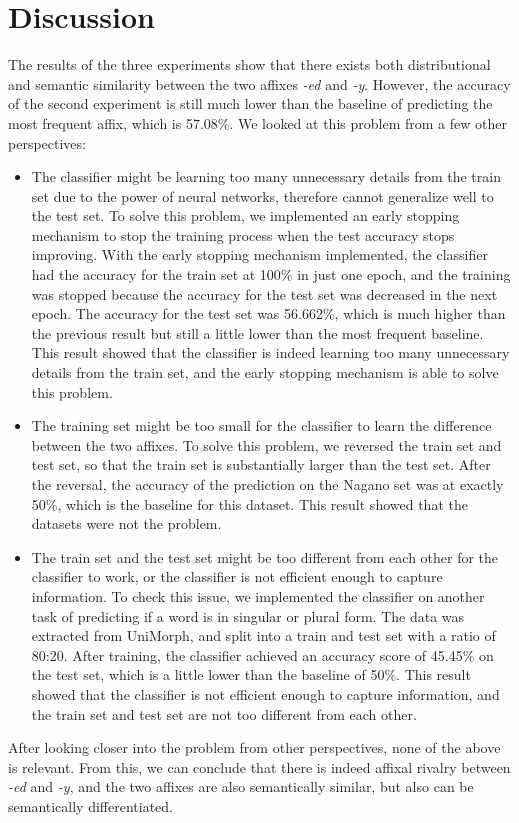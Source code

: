 \documentclass[12pt]{article}
\begin{document}
\section{Discussion}
    The results of the three experiments show that there exists both distributional and semantic similarity between the two affixes \emph{-ed} and \emph{-y}. However, the accuracy of the second experiment is still much lower than the baseline of predicting the most frequent affix, which is 57.08\%. We looked at this problem from a few other perspectives:
    \begin{itemize}
        \item The classifier might be learning too many unnecessary details from the train set due to the power of neural networks, therefore cannot generalize well to the test set. To solve this problem, we implemented an early stopping mechanism to stop the training process when the test accuracy stops improving. With the early stopping mechanism implemented, the classifier had the accuracy for the train set at 100\% in just one epoch, and the training was stopped because the accuracy for the test set was decreased in the next epoch. The accuracy for the test set was 56.662\%, which is much higher than the previous result but still a little lower than the most frequent baseline. This result showed that the classifier is indeed learning too many unnecessary details from the train set, and the early stopping mechanism is able to solve this problem. 
        \item The training set might be too small for the classifier to learn the difference between the two affixes. To solve this problem, we reversed the train set and test set, so that the train set is substantially larger than the test set. After the reversal, the accuracy of the prediction on the Nagano set was at exactly 50\%, which is the baseline for this dataset. This result showed that the datasets were not the problem. 
        \item The train set and the test set might be too different from each other for the classifier to work, or the classifier is not efficient enough to capture information. To check this issue, we implemented the classifier on another task of predicting if a word is in singular or plural form. The data was extracted from UniMorph, and split into a train and test set with a ratio of 80:20. After training, the classifier achieved an accuracy score of 45.45\% on the test set, which is a little lower than the baseline of 50\%. This result showed that the classifier is not efficient enough to capture information, and the train set and test set are not too different from each other.
        
    \end{itemize}
    After looking closer into the problem from other perspectives, none of the above is relevant. From this, we can conclude that there is indeed affixal rivalry between \emph{-ed} and \emph{-y}, and the two affixes are also semantically similar, but also can be semantically differentiated.
\end{document}
